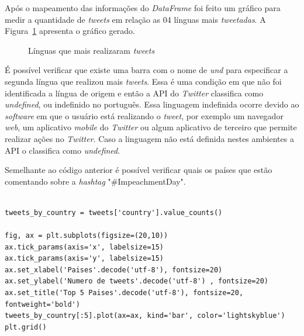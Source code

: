 Após o mapeamento das informações do \textit{DataFrame} foi feito um gráfico para medir a quantidade de \textit{tweets} em relação as 04 línguas mais \textit{tweetadas}. A Figura~\ref{lingua} apresenta o gráfico gerado.

\begin{figure}[h]
	\centering
	\caption{Línguas que mais realizaram \textit{tweets}}
	\vspace{-0.3cm}
	\label{lingua}
\end{figure}

É possível verificar que existe uma barra com o nome de \textit{und} para especificar a segunda língua que realizou mais \textit{tweets}. Essa é uma condição em que não foi identificada a língua de origem e então a API do \textit{Twitter} classifica como \textit{undefined}, ou indefinido no português. Essa linguagem indefinida ocorre devido ao \textit{software} em que o usuário está realizando o \textit{tweet}, por exemplo um navegador \textit{web}, um aplicativo \textit{mobile} do \textit{Twitter} ou algum aplicativo de terceiro que permite realizar ações no \textit{Twitter}. Caso a linguagem não está definida nestes ambientes a API o classifica como \textit{undefined}.

Semelhante ao código anterior é possível verificar quais os países que estão comentando sobre a \textit{hashtag} "\#ImpeachmentDay". \\ \\

\begin{lstlisting}
tweets_by_country = tweets['country'].value_counts()

fig, ax = plt.subplots(figsize=(20,10))
ax.tick_params(axis='x', labelsize=15)
ax.tick_params(axis='y', labelsize=15)
ax.set_xlabel('Paises'.decode('utf-8'), fontsize=20)
ax.set_ylabel('Numero de tweets'.decode('utf-8') , fontsize=20)
ax.set_title('Top 5 Paises'.decode('utf-8'), fontsize=20, fontweight='bold')
tweets_by_country[:5].plot(ax=ax, kind='bar', color='lightskyblue')
plt.grid()
\end{lstlisting}

